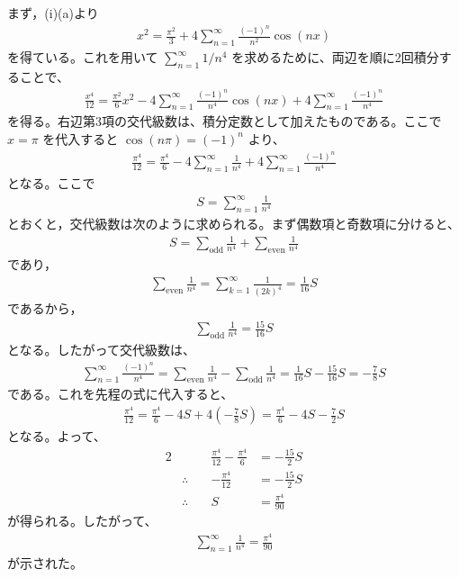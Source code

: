 \documentclass[platex,dvipdfmx,a4paper]{jsarticle}
\newcommand{\ssum}[3]{\sum_{#1=#2}^#3}
\begin{document}
  まず，(i)(a)より
  \begin{align*}
    x^2=\frac{\pi^2}{3}+4\sum_{n=1}^{\infty}\frac{(-1)^n}{n^2}\cos(nx)
  \end{align*}
  を得ている。これを用いて $\ssum{n}{1}{\infty} 1/n^4$ を求めるために、両辺を順に2回積分することで、
  \begin{align*}
    \frac{x^4}{12}
    =\frac{\pi^2}{6}x^2
    -4\sum_{n=1}^{\infty}\frac{(-1)^n}{n^4}\cos(nx)
    +4\sum_{n=1}^{\infty}\frac{(-1)^n}{n^4}
  \end{align*}
  を得る。右辺第3項の交代級数は、積分定数として加えたものである。ここで $x=\pi$ を代入すると $\cos(n\pi)=(-1)^n$ より、
  \begin{align*}
    \frac{\pi^4}{12}
    =\frac{\pi^4}{6}
    -4\sum_{n=1}^{\infty}\frac{1}{n^4}
    +4\sum_{n=1}^{\infty}\frac{(-1)^n}{n^4}
  \end{align*}
  となる。ここで
  \begin{align*}
    S=\sum_{n=1}^{\infty}\frac{1}{n^4}
  \end{align*}
  とおくと，交代級数は次のように求められる。まず偶数項と奇数項に分けると、
  \begin{align*}
    S=\sum_{\text{odd}} \frac{1}{n^4}+\sum_{\text{even}} \frac{1}{n^4}
  \end{align*}
  であり，
  \begin{align*}
    \sum_{\text{even}} \frac{1}{n^4}=\sum_{k=1}^{\infty}\frac{1}{(2k)^4}
    =\frac{1}{16}S
  \end{align*}
  であるから，
  \begin{align*}
    \sum_{\text{odd}} \frac{1}{n^4}=\frac{15}{16}S
  \end{align*}
  となる。したがって交代級数は、
  \begin{align*}
    \sum_{n=1}^{\infty}\frac{(-1)^n}{n^4}
    =\sum_{\text{even}} \frac{1}{n^4}-\sum_{\text{odd}} \frac{1}{n^4}
    =\frac{1}{16}S-\frac{15}{16}S
    =-\frac{7}{8}S
  \end{align*}
  である。これを先程の式に代入すると、
  \begin{align*}
    \frac{\pi^4}{12}
    =\frac{\pi^4}{6}-4S+4\left(-\frac{7}{8}S\right)
    =\frac{\pi^4}{6}-4S-\frac{7}{2}S
  \end{align*}
  となる。よって、
  \begin{alignat*}{2}
    &\phantom{\therefore\quad} & \frac{\pi^4}{12}-\frac{\pi^4}{6} &=-\frac{15}{2}S\\
    &\therefore\quad & -\frac{\pi^4}{12}&=-\frac{15}{2}S\\
    &\therefore\quad & S&=\frac{\pi^4}{90}
  \end{alignat*}
  が得られる。したがって、
  \begin{align*}
    \sum_{n=1}^{\infty}\frac{1}{n^4}=\frac{\pi^4}{90}
  \end{align*}
  が示された。
\end{document}
